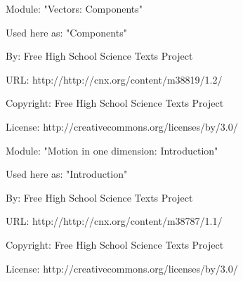       \par\vspace{9pt}\noindent\begin{minipage}{\textwidth}
      Module: "Vectors: Components" \par\nopagebreak\noindent
      Used here as: "Components" \par\nopagebreak\noindent
        By: Free High School Science Texts Project\par\nopagebreak\noindent
      URL: http://http://cnx.org/content/m38819/1.2/\par\nopagebreak\noindent
      \par\nopagebreak\noindent
      Copyright: Free High School Science Texts Project\par\nopagebreak\noindent
      License:  http://creativecommons.org/licenses/by/3.0/\par\nopagebreak\noindent
      \par\end{minipage}
      \par\vspace{9pt}\noindent\begin{minipage}{\textwidth}
      Module: "Motion in one dimension: Introduction" \par\nopagebreak\noindent
      Used here as: "Introduction" \par\nopagebreak\noindent
        By: Free High School Science Texts Project\par\nopagebreak\noindent
      URL: http://http://cnx.org/content/m38787/1.1/\par\nopagebreak\noindent
      \par\nopagebreak\noindent
      Copyright: Free High School Science Texts Project\par\nopagebreak\noindent
      License:  http://creativecommons.org/licenses/by/3.0/\par\nopagebreak\noindent
      \par\end{minipage}
